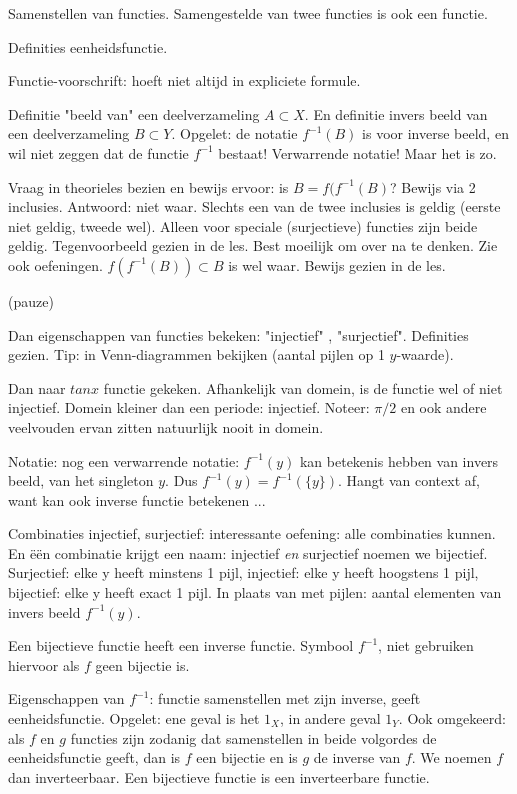 \documentclass{article}
\begin{document}
Samenstellen van functies. Samengestelde van twee functies is ook een functie. 

Definities eenheidsfunctie. 

Functie-voorschrift: hoeft niet altijd in expliciete formule. 

Definitie "beeld van" een deelverzameling $A \subset X$. En definitie invers beeld van een deelverzameling $B \subset Y$. Opgelet: de notatie $f^{-1}(B)$ is voor inverse beeld, en wil niet zeggen dat de functie $f^{-1} $ bestaat! Verwarrende notatie! Maar het is zo. 

Vraag in theorieles bezien en bewijs ervoor: is $B = f( f^{-1}(B) $? Bewijs via 2 inclusies. Antwoord: niet waar. Slechts een van de twee inclusies is geldig (eerste niet geldig, tweede wel). Alleen voor speciale (surjectieve) functies zijn beide geldig. Tegenvoorbeeld gezien in de les. Best moeilijk om over na te denken. Zie ook oefeningen. 
$f (f^{-1}(B)) \subset B$ is wel waar. Bewijs gezien in de les. 

(pauze)

Dan eigenschappen van functies bekeken: "injectief" , "surjectief". Definities gezien. Tip: in Venn-diagrammen bekijken (aantal pijlen op 1 $y$-waarde). 

Dan naar $tan x$ functie gekeken. Afhankelijk van domein, is de functie wel of niet injectief. Domein kleiner dan een periode: injectief. Noteer: $\pi /2$ en ook andere veelvouden ervan zitten natuurlijk nooit in domein. 

Notatie: nog een verwarrende notatie: $f^{-1}(y)$ kan betekenis hebben van invers beeld, van het singleton $y$. Dus $f^{-1}(y) = f^{-1}(\{y\})$. Hangt van context af, want kan ook inverse functie betekenen ... 

Combinaties injectief, surjectief: interessante oefening: alle combinaties kunnen. En \"e\"en combinatie krijgt een naam: injectief \emph{en } surjectief noemen we bijectief. Surjectief: elke y heeft minstens 1 pijl, injectief: elke y heeft hoogstens 1 pijl, bijectief: elke y heeft exact 1 pijl. In plaats van met pijlen: aantal elementen van invers beeld $f^{-1}(y)$. 

Een bijectieve functie heeft een inverse functie. Symbool $f^{-1}$, niet gebruiken hiervoor als $f$ geen bijectie is. 

Eigenschappen van $f^{-1}$: functie samenstellen met zijn inverse, geeft eenheidsfunctie. Opgelet: ene geval is het $1_X$, in andere geval $1_Y$. Ook omgekeerd: als $f$ en $g$ functies zijn zodanig dat samenstellen in beide volgordes de eenheidsfunctie geeft, dan is $f$ een bijectie en is $g$ de inverse van $f$. We noemen $f$ dan inverteerbaar. Een bijectieve functie is een inverteerbare functie. 
\end{document}
